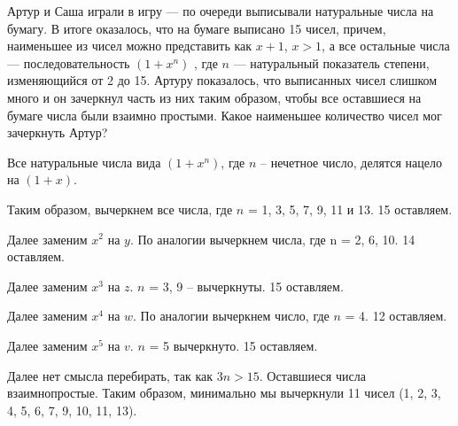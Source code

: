 
Артур и Саша играли в игру — по очереди выписывали натуральные числа на бумагу. В итоге оказалось, что на бумаге выписано 15 чисел, причем, наименьшее из чисел можно представить как $x+1$, $x > 1$, а все остальные числа — последовательность $(1+x^n)$ , где $n$  — натуральный показатель степени, изменяющийся от 2 до 15. Артуру показалось, что выписанных чисел слишком много и он зачеркнул часть из них таким образом, чтобы все оставшиеся на бумаге числа были взаимно простыми. Какое наименьшее количество чисел мог зачеркнуть Артур?

\solutionSection

Все натуральные числа вида $(1 + x^n)$, где $n$ -- нечетное число, делятся нацело на $(1+x)$.

Таким образом, вычеркнем все числа, где $n$ = 1, 3, 5, 7, 9, 11 и 13. 15 оставляем.

Далее заменим $x^2$ на $y$. По аналогии вычеркнем числа, где n = 2, 6, 10. 14 оставляем.

Далее заменим $x^3$ на $z$. $n$ = 3, 9 -- вычеркнуты. 15 оставляем. 

Далее заменим $x^4$ на $w$. По аналогии вычеркнем число, где $n$ = 4. 12 оставляем.

Далее заменим $x^5$ на $v$. $n$ = 5 вычеркнуто. 15 оставляем. 

Далее нет смысла перебирать, так как $3n > 15$. Оставшиеся числа взаимнопростые. Таким образом, минимально мы вычеркнули 11 чисел (1, 2, 3, 4, 5, 6, 7, 9, 10, 11, 13).

